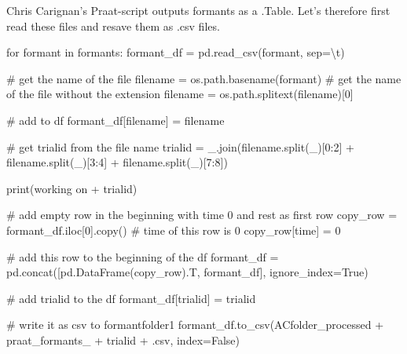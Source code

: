 \documentclass[
  letterpaper,
  DIV=11,
  numbers=noendperiod]{scrreprt}
\newenvironment{Shaded}{\begin{snugshade}}{\end{snugshade}}
\newcommand{\BuiltInTok}[1]{\textcolor[rgb]{0.00,0.23,0.31}{#1}}
\newcommand{\CharTok}[1]{\textcolor[rgb]{0.13,0.47,0.30}{#1}}
\newcommand{\CommentTok}[1]{\textcolor[rgb]{0.37,0.37,0.37}{#1}}
\newcommand{\ControlFlowTok}[1]{\textcolor[rgb]{0.00,0.23,0.31}{#1}}
\newcommand{\DecValTok}[1]{\textcolor[rgb]{0.68,0.00,0.00}{#1}}
\newcommand{\KeywordTok}[1]{\textcolor[rgb]{0.00,0.23,0.31}{#1}}
\newcommand{\NormalTok}[1]{\textcolor[rgb]{0.00,0.23,0.31}{#1}}
\newcommand{\OperatorTok}[1]{\textcolor[rgb]{0.37,0.37,0.37}{#1}}
\newcommand{\StringTok}[1]{\textcolor[rgb]{0.13,0.47,0.30}{#1}}
\newcommand{\VariableTok}[1]{\textcolor[rgb]{0.07,0.07,0.07}{#1}}
\begin{document}
Chris Carignan's Praat-script outputs formants as a .Table. Let's
therefore first read these files and resave them as .csv files.

\begin{Shaded}
\begin{Highlighting}[]
\ControlFlowTok{for}\NormalTok{ formant }\KeywordTok{in}\NormalTok{ formants:}
\NormalTok{    formant\_df }\OperatorTok{=}\NormalTok{ pd.read\_csv(formant, sep}\OperatorTok{=}\StringTok{\textquotesingle{}}\CharTok{\textbackslash{}t}\StringTok{\textquotesingle{}}\NormalTok{)}

    \CommentTok{\# get the name of the file}
\NormalTok{    filename }\OperatorTok{=}\NormalTok{ os.path.basename(formant)}
    \CommentTok{\# get the name of the file without the extension}
\NormalTok{    filename }\OperatorTok{=}\NormalTok{ os.path.splitext(filename)[}\DecValTok{0}\NormalTok{]}

    \CommentTok{\# add to df}
\NormalTok{    formant\_df[}\StringTok{\textquotesingle{}filename\textquotesingle{}}\NormalTok{] }\OperatorTok{=}\NormalTok{ filename}

    \CommentTok{\# get trialid from the file name }
\NormalTok{    trialid }\OperatorTok{=} \StringTok{\textquotesingle{}\_\textquotesingle{}}\NormalTok{.join(filename.split(}\StringTok{\textquotesingle{}\_\textquotesingle{}}\NormalTok{)[}\DecValTok{0}\NormalTok{:}\DecValTok{2}\NormalTok{] }\OperatorTok{+}\NormalTok{ filename.split(}\StringTok{\textquotesingle{}\_\textquotesingle{}}\NormalTok{)[}\DecValTok{3}\NormalTok{:}\DecValTok{4}\NormalTok{] }\OperatorTok{+}\NormalTok{ filename.split(}\StringTok{\textquotesingle{}\_\textquotesingle{}}\NormalTok{)[}\DecValTok{7}\NormalTok{:}\DecValTok{8}\NormalTok{]) }

    \BuiltInTok{print}\NormalTok{(}\StringTok{\textquotesingle{}working on \textquotesingle{}} \OperatorTok{+}\NormalTok{ trialid)}

    \CommentTok{\# add empty row in the beginning with time 0 and rest as first row}
\NormalTok{    copy\_row }\OperatorTok{=}\NormalTok{ formant\_df.iloc[}\DecValTok{0}\NormalTok{].copy()}
    \CommentTok{\# time of this row is 0}
\NormalTok{    copy\_row[}\StringTok{\textquotesingle{}time\textquotesingle{}}\NormalTok{] }\OperatorTok{=} \DecValTok{0}

    \CommentTok{\# add this row to the beginning of the df}
\NormalTok{    formant\_df }\OperatorTok{=}\NormalTok{ pd.concat([pd.DataFrame(copy\_row).T, formant\_df], ignore\_index}\OperatorTok{=}\VariableTok{True}\NormalTok{)}
    
    \CommentTok{\# add trialid to the df}
\NormalTok{    formant\_df[}\StringTok{\textquotesingle{}trialid\textquotesingle{}}\NormalTok{] }\OperatorTok{=}\NormalTok{ trialid}

    \CommentTok{\# write it as csv to formantfolder1}
\NormalTok{    formant\_df.to\_csv(ACfolder\_processed }\OperatorTok{+} \StringTok{\textquotesingle{}praat\_formants\_\textquotesingle{}} \OperatorTok{+}\NormalTok{ trialid }\OperatorTok{+} \StringTok{\textquotesingle{}.csv\textquotesingle{}}\NormalTok{, index}\OperatorTok{=}\VariableTok{False}\NormalTok{)}
\end{Highlighting}
\end{Shaded}
\end{document}
